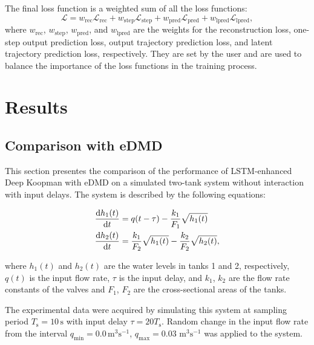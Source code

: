 \documentclass[conference]{IEEEtran}
\newcommand{\ui}[2]{#1_{\text{#2}}}
\begin{document}
The final loss function is a weighted sum of all the loss functions:
\begin{equation}
    \mathcal{L} = \ui{w}{rec}\mathcal{L}_{\text{rec}} + \ui{w}{step}\mathcal{L}_{\text{step}} + \ui{w}{pred}\mathcal{L}_{\text{pred}} + \ui{w}{lpred}\mathcal{L}_{\text{lpred}},
\end{equation}
where \(\ui{w}{rec}\), \(\ui{w}{step}\), \(\ui{w}{pred}\), and \(\ui{w}{lpred}\) are the weights for the reconstruction loss, one-step output prediction loss, output trajectory prediction loss, and latent trajectory prediction loss, respectively. They are set by the user and are used to balance the importance of the loss functions in the training process.

\section{Results}

\subsection{Comparison with eDMD}

This section presentes the comparison of the performance of LSTM-enhanced Deep Koopman with eDMD on a simulated two-tank system without interaction with input delays. The system is described by the following equations:

\begin{equation}\label{eq:two_tanks_system}
    \begin{aligned}
        \diff{h_1(t)}{t} & = q(t-\tau) - \frac{k_1}{F_1}\sqrt{h_1(t)}                     \\
        \diff{h_2(t)}{t} & = \frac{k_1}{F_2}\sqrt{h_1(t)} - \frac{k_2}{F_2}\sqrt{h_2(t)},
    \end{aligned}
\end{equation}

where \(h_1(t)\) and \(h_2(t)\) are the water levels in tanks 1 and 2, respectively, \(q(t)\) is the input flow rate, \(\tau \) is the input delay, and \(k_1\), \(k_2\) are the flow rate constants of the valves and \(F_1\), \(F_2\) are the cross-sectional areas of the tanks.

The experimental data were acquired by simulating this system at sampling period \( \ui{T}{s} = 10 \, \mathrm{s} \) with input delay \( \tau = 20\ui{T}{s} \). Random change in the input flow rate from the interval \( \ui{q}{min} = 0.0 \, \text{m}^3\text{s}^{-1} \), \( \ui{q}{max} = 0.03 \) \( \text{m}^3\text{s}^{-1} \) was applied to the system.
\end{document}
